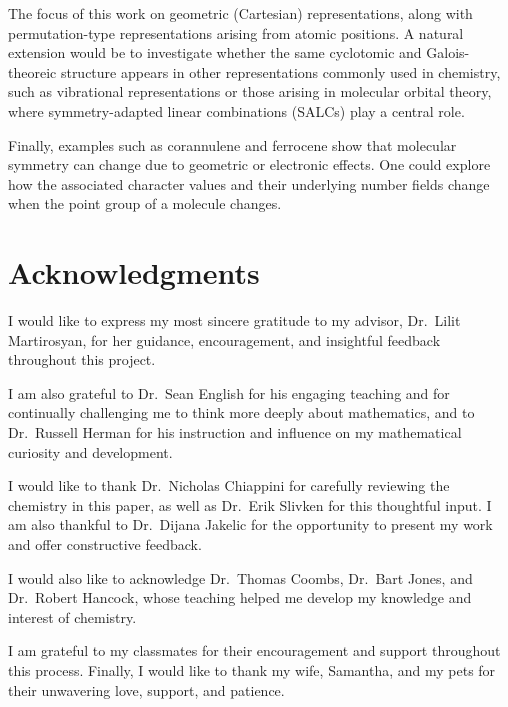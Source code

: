 \documentclass{article}
\begin{document}
    The focus of this work on geometric (Cartesian) representations, along with permutation-type representations arising from atomic positions. A natural extension would be to investigate whether the same cyclotomic and Galois-theoreic structure appears in other representations commonly used in chemistry, such as vibrational representations or those arising in molecular orbital theory, where symmetry-adapted linear combinations (SALCs) play a central role.

    Finally, examples such as corannulene and ferrocene show that molecular symmetry can change due to geometric or electronic effects. One could explore how the associated character values and their underlying number fields change when the point group of a molecule changes.
    
    \section{Acknowledgments}

    I would like to express my most sincere gratitude to my advisor, Dr.\ Lilit Martirosyan, for her guidance, encouragement, and insightful feedback throughout this project.

    I am also grateful to Dr.\ Sean English for his engaging teaching and for continually challenging me to think more deeply about mathematics, and to Dr.\ Russell Herman for his instruction and influence on my mathematical curiosity and development.

    I would like to thank Dr.\ Nicholas Chiappini for carefully reviewing the chemistry in this paper, as well as Dr.\ Erik Slivken for this thoughtful input. I am also thankful to Dr.\ Dijana Jakelic for the opportunity to present my work and offer constructive feedback.

    I would also like to acknowledge Dr.\ Thomas Coombs, Dr.\ Bart Jones, and Dr.\ Robert Hancock, whose teaching helped me develop my knowledge and interest of chemistry.

    I am grateful to my classmates for their encouragement and support throughout this process. Finally, I would like to thank my wife, Samantha, and my pets for their unwavering love, support, and patience.   

    \printbibliography[heading=bibnumbered]
\end{document}
